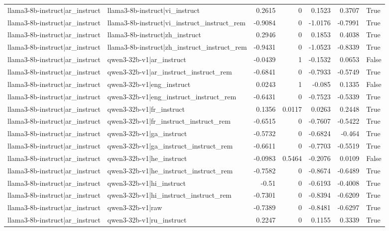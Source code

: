 \begin{table}
\begin{tabular}{l l r r r r l}
llama3-8b-instruct|ar_instruct & llama3-8b-instruct|vi_instruct & 0.2615 & 0 & 0.1523 & 0.3707 & True \\
llama3-8b-instruct|ar_instruct & llama3-8b-instruct|vi_instruct_instruct_rem & -0.9084 & 0 & -1.0176 & -0.7991 & True \\
llama3-8b-instruct|ar_instruct & llama3-8b-instruct|zh_instruct & 0.2946 & 0 & 0.1853 & 0.4038 & True \\
llama3-8b-instruct|ar_instruct & llama3-8b-instruct|zh_instruct_instruct_rem & -0.9431 & 0 & -1.0523 & -0.8339 & True \\
llama3-8b-instruct|ar_instruct & qwen3-32b-v1|ar_instruct & -0.0439 & 1 & -0.1532 & 0.0653 & False \\
llama3-8b-instruct|ar_instruct & qwen3-32b-v1|ar_instruct_instruct_rem & -0.6841 & 0 & -0.7933 & -0.5749 & True \\
llama3-8b-instruct|ar_instruct & qwen3-32b-v1|eng_instruct & 0.0243 & 1 & -0.085 & 0.1335 & False \\
llama3-8b-instruct|ar_instruct & qwen3-32b-v1|eng_instruct_instruct_rem & -0.6431 & 0 & -0.7523 & -0.5339 & True \\
llama3-8b-instruct|ar_instruct & qwen3-32b-v1|fr_instruct & 0.1356 & 0.0117 & 0.0263 & 0.2448 & True \\
llama3-8b-instruct|ar_instruct & qwen3-32b-v1|fr_instruct_instruct_rem & -0.6515 & 0 & -0.7607 & -0.5422 & True \\
llama3-8b-instruct|ar_instruct & qwen3-32b-v1|ga_instruct & -0.5732 & 0 & -0.6824 & -0.464 & True \\
llama3-8b-instruct|ar_instruct & qwen3-32b-v1|ga_instruct_instruct_rem & -0.6611 & 0 & -0.7703 & -0.5519 & True \\
llama3-8b-instruct|ar_instruct & qwen3-32b-v1|he_instruct & -0.0983 & 0.5464 & -0.2076 & 0.0109 & False \\
llama3-8b-instruct|ar_instruct & qwen3-32b-v1|he_instruct_instruct_rem & -0.7582 & 0 & -0.8674 & -0.6489 & True \\
llama3-8b-instruct|ar_instruct & qwen3-32b-v1|hi_instruct & -0.51 & 0 & -0.6193 & -0.4008 & True \\
llama3-8b-instruct|ar_instruct & qwen3-32b-v1|hi_instruct_instruct_rem & -0.7301 & 0 & -0.8394 & -0.6209 & True \\
llama3-8b-instruct|ar_instruct & qwen3-32b-v1|raw & -0.7389 & 0 & -0.8481 & -0.6297 & True \\
llama3-8b-instruct|ar_instruct & qwen3-32b-v1|ru_instruct & 0.2247 & 0 & 0.1155 & 0.3339 & True \\

\end{tabular}
\end{table}
